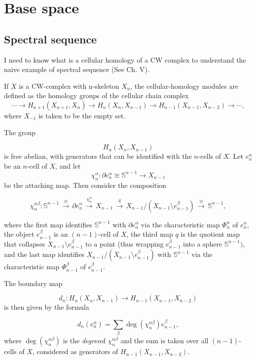 \section{Base space}

 \subsection{Spectral sequence}
 I need to know what is a cellular homology of a CW complex to understand the naive example of spectral sequence (See \cite{hatcher} Ch. V).\par
 
 If $X$ is a CW-complex with n-skeleton  $X_{n}$, the cellular-homology modules are defined as the homology groups of the cellular chain complex
\[\cdots \to {H_{n+1}}(X_{n+1},X_{n})\to {H_{n}}(X_{n},X_{n-1})\to {H_{n-1}}(X_{n-1},X_{n-2})\to \cdots ,\]
where  $X_{-1}$ is taken to be the empty set.

The group

 \[ {H_{n}}(X_{n},X_{n-1})\]
is free abelian, with generators that can be identified with the  $n$-cells of  $X$. Let  $e_{n}^{\alpha }$ be an $n$-cell of $X$, and let  \[ \chi _{n}^{\alpha }:\partial e_{n}^{\alpha }\cong \mathbb {S} ^{n-1}\to X_{n-1}\] be the attaching map. Then consider the composition

 \[\chi _{n}^{\alpha \beta }:\mathbb {S} ^{n-1}\,{\stackrel {\cong }{\longrightarrow }}\,\partial e_{n}^{\alpha }\,{\stackrel {\chi _{n}^{\alpha }}{\longrightarrow }}\,X_{n-1}\,{\stackrel {q}{\longrightarrow }}\,X_{n-1}/\left(X_{n-1}\setminus e_{n-1}^{\beta }\right)\,{\stackrel {\cong }{\longrightarrow }}\,\mathbb {S} ^{n-1},\]

where the first map identifies $\mathbb {S} ^{n-1}$ with $\partial e_{n}^{\alpha }$ via the characteristic map  $\Phi _{n}^{\alpha }$ of $e_{n}^{\alpha }$, the object $e_{n-1}^{\beta }$ is an  $(n-1)$-cell of $X$, the third map  $q$ is the quotient map that collapses $X_{n-1}\setminus e_{n-1}^{\beta }$ to a point (thus wrapping  $e_{n-1}^{\beta }$ into a sphere  $\mathbb {S} ^{n-1})$, and the last map identifies $X_{n-1}/\left(X_{n-1}\setminus e_{n-1}^{\beta }\right)$ with  $\mathbb {S} ^{n-1}$ via the characteristic map  $\Phi _{n-1}^{\beta }$ of  $e_{n-1}^{\beta }$.

The boundary map

 \[d_{n}:{H_{n}}(X_{n},X_{n-1})\to {H_{n-1}}(X_{n-1},X_{n-2})\]
is then given by the formula

 \[{d_{n}}(e_{n}^{\alpha })=\sum _{\beta }\deg \left(\chi _{n}^{\alpha \beta }\right)e_{n-1}^{\beta },\]
where  $\deg \left(\chi _{n}^{\alpha \beta }\right)$ is the \textit{degree}\footnotemark of  $\chi _{n}^{\alpha \beta }$ and the sum is taken over all $(n-1)$-cells of $X$, considered as generators of ${H_{n-1}}(X_{n-1},X_{n-2})$.


